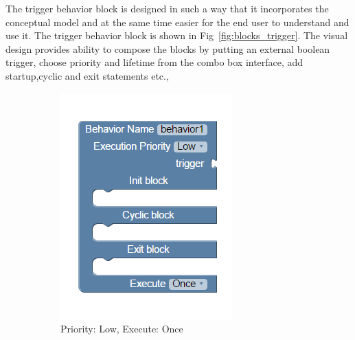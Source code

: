 The trigger behavior block is designed in such a way that it incorporates the conceptual model and at the same time easier for the end user to understand and use it. The trigger behavior block is shown in Fig~\ref{fig:blocks_trigger}. The visual design provides ability to compose the blocks by putting an external boolean trigger, choose priority and lifetime from the combo box interface, add startup,cyclic and exit statements etc.,
\begin{figure}[H]
\centering
\begin{subfigure}[t]{0.38\textwidth}
\includegraphics[width=\textwidth]{../thesis/assets/blocks_behavior1.png}
\caption[Example 1]{Priority: Low, Execute: Once}
\label{fig:trigger_block1}
\end{subfigure}
\begin{subfigure}[t]{0.38\textwidth}

\end{subfigure}
\end{figure}
